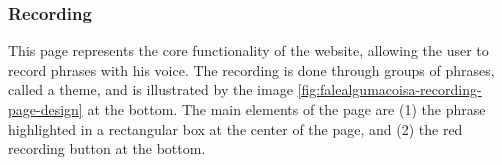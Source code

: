 \subsubsection{Recording}

This page represents the core functionality of the website, allowing the user to record phrases with his voice. The recording is done through groups of phrases, called a theme, and is illustrated by the image \ref{fig:falealgumacoisa-recording-page-design} at the bottom. The main elements of the page are (1) the phrase highlighted in a rectangular box at the center of the page, and (2) the red recording button at the bottom.

\begin{figure}[ht]
    \centering
    \caption{Fale Alguma Coisa Recording Page designs}
    \begin{subfigure}{.5\textwidth}
      \centering

\end{subfigure}
\end{figure}

